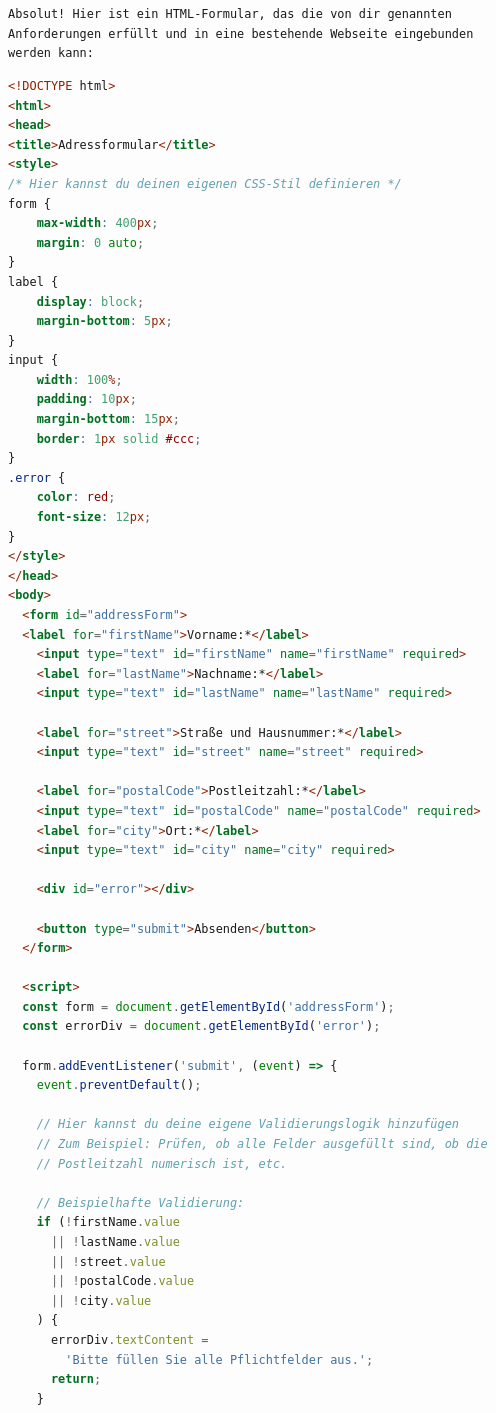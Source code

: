 \begin{tcolorbox}[
	enhanced,
	breakable,
	colback=BhtGrey!5!white,
	colframe=BhtGrey!75!black!50,
	title= LLM Antwort Gemini
	]
\texttt{Absolut! Hier ist ein HTML-Formular, das die von dir genannten An\-for\-der\-ung\-en er\-füllt und in eine bestehende Webseite eingebunden werden kann:}
\begin{lstlisting}[language=HTML]
<!DOCTYPE html>
<html>
<head>
<title>Adressformular</title>
<style>
/* Hier kannst du deinen eigenen CSS-Stil definieren */
form {
	max-width: 400px;
	margin: 0 auto;
}
label {
	display: block;
	margin-bottom: 5px;
}
input {
	width: 100%;
	padding: 10px;
	margin-bottom: 15px;
	border: 1px solid #ccc;
}
.error {
	color: red;
	font-size: 12px;
}
</style>
</head>
<body>
  <form id="addressForm">
  <label for="firstName">Vorname:*</label>
    <input type="text" id="firstName" name="firstName" required>
    <label for="lastName">Nachname:*</label>
    <input type="text" id="lastName" name="lastName" required>

    <label for="street">Straße und Hausnummer:*</label>
    <input type="text" id="street" name="street" required>

    <label for="postalCode">Postleitzahl:*</label>
    <input type="text" id="postalCode" name="postalCode" required>
    <label for="city">Ort:*</label>
    <input type="text" id="city" name="city" required>

    <div id="error"></div>

    <button type="submit">Absenden</button>
  </form>

  <script>
  const form = document.getElementById('addressForm');
  const errorDiv = document.getElementById('error');

  form.addEventListener('submit', (event) => {
    event.preventDefault();

    // Hier kannst du deine eigene Validierungslogik hinzufügen
    // Zum Beispiel: Prüfen, ob alle Felder ausgefüllt sind, ob die
    // Postleitzahl numerisch ist, etc.

    // Beispielhafte Validierung:
    if (!firstName.value
      || !lastName.value
      || !street.value
      || !postalCode.value
      || !city.value
    ) {
      errorDiv.textContent =
        'Bitte füllen Sie alle Pflichtfelder aus.';
      return;
    }


\end{lstlisting}
\end{tcolorbox}
